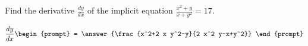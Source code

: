 \documentclass{ximera}
\author{Gregory Hartman \and Matthew Carr}
\begin{document}
\begin{exercise}




Find the derivative $\frac{dy}{dx}$ of the implicit equation $\frac{x^2+y}{x+y^2}=17$.

\[
\frac{dy}{dx}
\begin{prompt}
= \answer{\frac{x^2+2 x y^2-y}{2 x^2 y-x+y^2}}
\end{prompt}
\]


\end{exercise}
\end{document}
